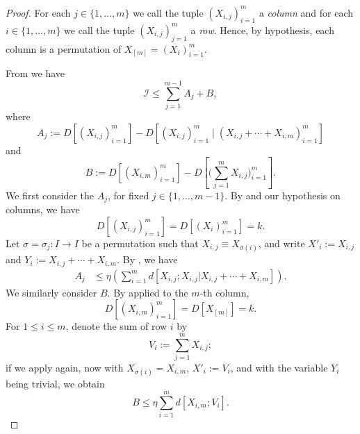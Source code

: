 \documentclass[10pt,a4paper]{article}
\newcommand{\uses}[1]{}
\newcommand{\leanok}{}
\begin{document}
\begin{proof}\uses{cor-multid, multidist-perm, cond-multidist-lower-II, first-useful, klm-3, sumset-lower, ruzsa-triangle, compare-sums, multidist-ruzsa-II}\leanok
  For each $j \in \{1,\dots,m\}$ we call the tuple $(X_{i,j})_{i = 1}^m$ a \emph{column} and for each $i \in \{1,\dots, m\}$ we call the tuple $(X_{i,j})_{j = 1}^m$ a \emph{row}. Hence, by hypothesis, each column is a permutation of $X_{[m]} = (X_i)_{i=1}^m$.

From  we have
\begin{equation}\label{441} {\mathcal I} \leq \sum_{j=1}^{m-1} A_j + B,\end{equation}
where
\[
  A_j := D[ (X_{i, j})_{i = 1}^m] - D[ (X_{i, j})_{i = 1}^m  \; \big| \; (X_{i,j} + \cdots + X_{i,m})_{i =1}^m  ]
\]
and
\[
  B := D[ (X_{i,m})_{i=1}^m ] - D[ \bigl(\sum_{j=1}^m X_{i,j}\bigr)_{i=1}^m ].
\]
We first consider the $A_j$, for fixed $j \in \{1,\dots, m-1\}$.
By  and our hypothesis on columns, we have
\[
  D[ (X_{i, j})_{i = 1}^m ]= D[ (X_i)_{i=1}^m ] = k.
\]
Let $\sigma = \sigma_j \colon I \to I$ be a permutation such that $X_{i,j} \equiv X_{\sigma(i)}$, and write $X'_i := X_{i,j}$ and $Y_i := X_{i,j} + \cdots + X_{i,m}$.
By , we have
\begin{align}
  A_j & \leq \eta (\sum_{i = 1}^{m} d[X_{i,j}; X_{i, j}|X_{i, j} + \cdots + X_{i,m}]).\label{54a}
\end{align}
We similarly consider $B$.  By  applied to the $m$-th column,
\[
  D[ (X_{i, m})_{i = 1}^m ] = D[X_{[m]}] = k.
\]
For $1 \leq i \leq m$, denote the sum of row $i$ by
\[
  V_i := \sum_{j=1}^m X_{i,j};
\]
if we apply  again, now with $X_{\sigma(i)} = X_{i,m}$, $X'_i := V_i$, and with the variable $Y_i$ being trivial, we obtain
\begin{equation}\label{55a}
  B \leq \eta \sum_{i = 1}^m d[X_{i,m}; V_i].
\end{equation}


\end{proof}
\end{document}

